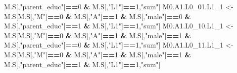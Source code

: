 \documentclass[
]{book}
\newenvironment{Shaded}{\begin{snugshade}}{\end{snugshade}}
\newcommand{\DecValTok}[1]{\textcolor[rgb]{0.00,0.00,0.81}{#1}}
\newcommand{\NormalTok}[1]{#1}
\newcommand{\OtherTok}[1]{\textcolor[rgb]{0.56,0.35,0.01}{#1}}
\newcommand{\SpecialCharTok}[1]{\textcolor[rgb]{0.81,0.36,0.00}{\textbf{#1}}}
\newcommand{\StringTok}[1]{\textcolor[rgb]{0.31,0.60,0.02}{#1}}
\begin{document}
\begin{Shaded}
\begin{Highlighting}[]
\NormalTok{                            M.S[,}\StringTok{"parent\_educ"}\NormalTok{]}\SpecialCharTok{==}\DecValTok{0} \SpecialCharTok{\&}\NormalTok{ M.S[,}\StringTok{"L1"}\NormalTok{]}\SpecialCharTok{==}\DecValTok{1}\NormalTok{,}\StringTok{"sum"}\NormalTok{]}
\NormalTok{  M0.A1.L0\_01.L1\_1 }\OtherTok{\textless{}{-}}\NormalTok{ M.S[M.S[,}\StringTok{"M"}\NormalTok{]}\SpecialCharTok{==}\DecValTok{0} \SpecialCharTok{\&}\NormalTok{ M.S[,}\StringTok{"A"}\NormalTok{]}\SpecialCharTok{==}\DecValTok{1} \SpecialCharTok{\&}\NormalTok{ M.S[,}\StringTok{"male"}\NormalTok{]}\SpecialCharTok{==}\DecValTok{0} \SpecialCharTok{\&} 
\NormalTok{                            M.S[,}\StringTok{"parent\_educ"}\NormalTok{]}\SpecialCharTok{==}\DecValTok{1} \SpecialCharTok{\&}\NormalTok{ M.S[,}\StringTok{"L1"}\NormalTok{]}\SpecialCharTok{==}\DecValTok{1}\NormalTok{,}\StringTok{"sum"}\NormalTok{]}
\NormalTok{  M0.A1.L0\_10.L1\_1 }\OtherTok{\textless{}{-}}\NormalTok{ M.S[M.S[,}\StringTok{"M"}\NormalTok{]}\SpecialCharTok{==}\DecValTok{0} \SpecialCharTok{\&}\NormalTok{ M.S[,}\StringTok{"A"}\NormalTok{]}\SpecialCharTok{==}\DecValTok{1} \SpecialCharTok{\&}\NormalTok{ M.S[,}\StringTok{"male"}\NormalTok{]}\SpecialCharTok{==}\DecValTok{1} \SpecialCharTok{\&} 
\NormalTok{                            M.S[,}\StringTok{"parent\_educ"}\NormalTok{]}\SpecialCharTok{==}\DecValTok{0} \SpecialCharTok{\&}\NormalTok{ M.S[,}\StringTok{"L1"}\NormalTok{]}\SpecialCharTok{==}\DecValTok{1}\NormalTok{,}\StringTok{"sum"}\NormalTok{]}
\NormalTok{  M0.A1.L0\_11.L1\_1 }\OtherTok{\textless{}{-}}\NormalTok{ M.S[M.S[,}\StringTok{"M"}\NormalTok{]}\SpecialCharTok{==}\DecValTok{0} \SpecialCharTok{\&}\NormalTok{ M.S[,}\StringTok{"A"}\NormalTok{]}\SpecialCharTok{==}\DecValTok{1} \SpecialCharTok{\&}\NormalTok{ M.S[,}\StringTok{"male"}\NormalTok{]}\SpecialCharTok{==}\DecValTok{1} \SpecialCharTok{\&} 
\NormalTok{                            M.S[,}\StringTok{"parent\_educ"}\NormalTok{]}\SpecialCharTok{==}\DecValTok{1} \SpecialCharTok{\&}\NormalTok{ M.S[,}\StringTok{"L1"}\NormalTok{]}\SpecialCharTok{==}\DecValTok{1}\NormalTok{,}\StringTok{"sum"}\NormalTok{]}
  

\end{Highlighting}
\end{Shaded}
\end{document}
